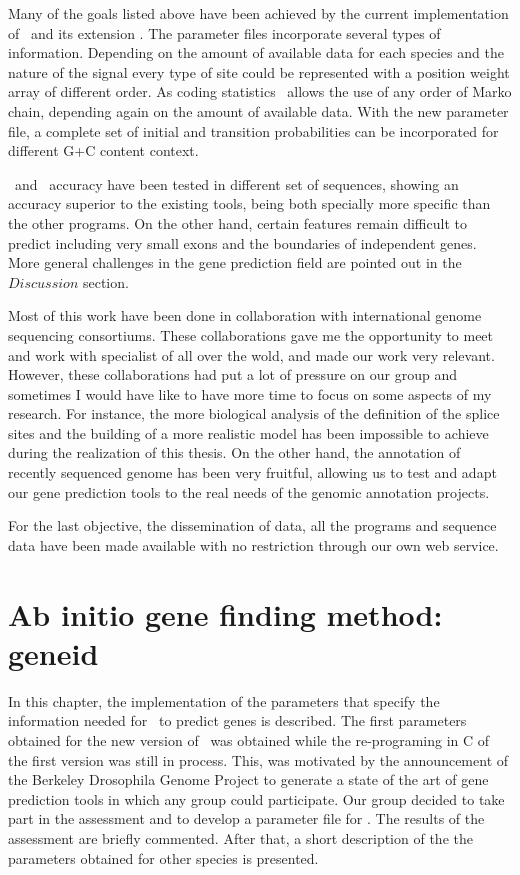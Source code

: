 Many of the goals listed above have been achieved by the current
implementation of \geneid\ and its extension \sgp. The parameter files
incorporate several types of information. Depending on the amount of
available data for each species and the nature of the signal every
type of site could be represented with a position weight array of
different order. As coding statistics \geneid\ allows the use of any
order of Marko chain, depending again on the amount of available
data. With the new parameter file, a complete set of initial and
transition probabilities can be incorporated for different G+C content
context.

\geneid\ and \sgp\ accuracy have been tested in different set of
sequences, showing an accuracy superior to the existing tools, being
both specially more specific than the other programs. On the other
hand, certain features remain difficult to predict including very
small exons and the boundaries of independent genes. More general
challenges in the gene prediction field are pointed out in the
$Discussion$ section.

Most of this work have been done in collaboration with international
genome sequencing consortiums. These collaborations gave me the
opportunity to meet and work with specialist of all over the wold, and
made our work very relevant. However, these collaborations had put a
lot of pressure on our group and sometimes I would have like to have
more time to focus on some aspects of my research. For instance, the
more biological analysis of the definition of the splice sites and the
building of a more realistic model has been impossible to achieve
during the realization of this thesis. On the other hand, the
annotation of recently sequenced genome has been very fruitful,
allowing us to test and adapt our gene prediction tools to the real
needs of the genomic annotation projects.

For the last objective, the dissemination of data, all the programs and
sequence data have been made available with no restriction through our
own web service.


\newpage


\chapter{Ab initio gene finding method: geneid} 

In this chapter, the implementation of the parameters that specify the
information needed for \geneid\ to predict genes is described. The
first parameters obtained for the new version of \geneid\ was obtained
while the re-programing in C of the first version was still in
process. This, was motivated by the announcement of the Berkeley
Drosophila Genome Project to generate a state of the art of gene
prediction tools in which any group could participate. Our group
decided to take part in the assessment and to develop a parameter file
for \DmL. The results of the assessment are briefly commented.
After that, a short description of the the parameters obtained for
other species is presented.

